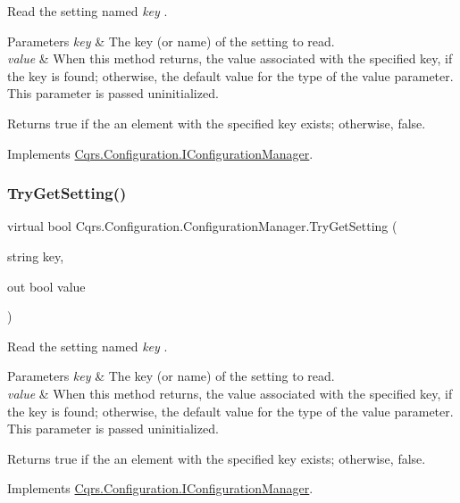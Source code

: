 Read the setting named {\itshape key} . 


\begin{DoxyParams}{Parameters}
{\em key} & The key (or name) of the setting to read.\\
\hline
{\em value} & When this method returns, the value associated with the specified key, if the key is found; otherwise, the default value for the type of the value parameter. This parameter is passed uninitialized.\\
\hline
\end{DoxyParams}
\begin{DoxyReturn}{Returns}
true if the an element with the specified key exists; otherwise, false.
\end{DoxyReturn}


Implements \hyperlink{interfaceCqrs_1_1Configuration_1_1IConfigurationManager_ac4478405e3d9e1c97d14953aea4e695b_ac4478405e3d9e1c97d14953aea4e695b}{Cqrs.\+Configuration.\+I\+Configuration\+Manager}.

\mbox{\label{classCqrs_1_1Configuration_1_1ConfigurationManager_a40810d0b9fd2f3d1c4a270681e908c84_a40810d0b9fd2f3d1c4a270681e908c84}} 
\subsubsection{\texorpdfstring{Try\+Get\+Setting()}{TryGetSetting()}\hspace{0.1cm}{\footnotesize\ttfamily [2/2]}}
{\footnotesize\ttfamily virtual bool Cqrs.\+Configuration.\+Configuration\+Manager.\+Try\+Get\+Setting (\begin{DoxyParamCaption}\item[{string}]{key,  }\item[{out bool}]{value }\end{DoxyParamCaption})\hspace{0.3cm}{\ttfamily [virtual]}}



Read the setting named {\itshape key} . 


\begin{DoxyParams}{Parameters}
{\em key} & The key (or name) of the setting to read.\\
\hline
{\em value} & When this method returns, the value associated with the specified key, if the key is found; otherwise, the default value for the type of the value parameter. This parameter is passed uninitialized.\\
\hline
\end{DoxyParams}
\begin{DoxyReturn}{Returns}
true if the an element with the specified key exists; otherwise, false.
\end{DoxyReturn}


Implements \hyperlink{interfaceCqrs_1_1Configuration_1_1IConfigurationManager_a8389181330999fcb8e30af4dbb56d35e_a8389181330999fcb8e30af4dbb56d35e}{Cqrs.\+Configuration.\+I\+Configuration\+Manager}.

